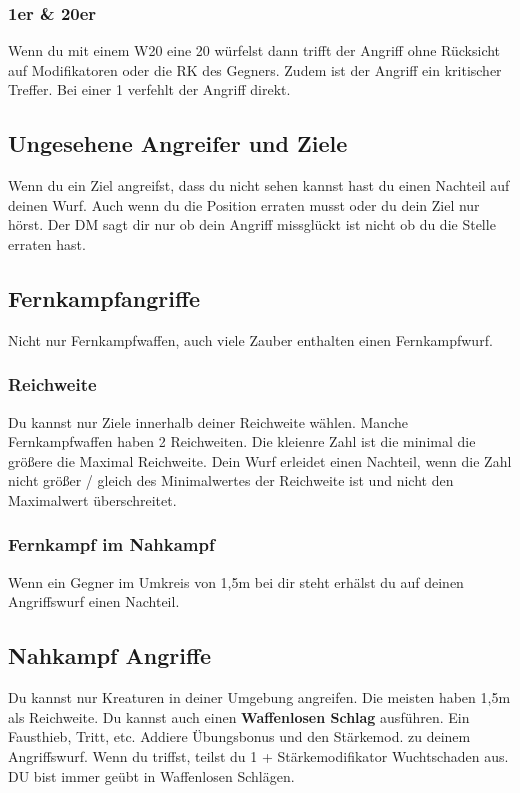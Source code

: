 \subsubsection{1er \& 20er}
Wenn du mit einem W20 eine 20 würfelst dann trifft der Angriff ohne Rücksicht auf Modifikatoren oder die RK des Gegners. Zudem ist der Angriff ein kritischer Treffer. Bei einer 1 verfehlt der Angriff direkt.

\subsection{Ungesehene Angreifer und Ziele}
Wenn du ein Ziel angreifst, dass du nicht sehen kannst hast du einen Nachteil auf deinen Wurf. Auch wenn du die Position erraten musst oder du dein Ziel nur hörst. Der DM sagt dir nur ob dein Angriff missglückt ist nicht ob du die Stelle erraten hast.

\subsection{Fernkampfangriffe}
Nicht nur Fernkampfwaffen, auch viele Zauber enthalten einen Fernkampfwurf.

\subsubsection{Reichweite}
Du kannst nur Ziele innerhalb deiner Reichweite wählen. Manche Fernkampfwaffen haben 2 Reichweiten. Die kleienre Zahl ist die minimal die größere die Maximal Reichweite. Dein Wurf erleidet einen Nachteil, wenn die Zahl nicht größer / gleich des Minimalwertes der Reichweite ist und nicht den Maximalwert überschreitet.

\subsubsection{Fernkampf im Nahkampf}
Wenn ein Gegner im Umkreis von 1,5m bei dir steht erhälst du auf deinen Angriffswurf einen Nachteil.

\subsection{Nahkampf Angriffe}
Du kannst nur Kreaturen in deiner Umgebung angreifen. Die meisten haben 1,5m als Reichweite. Du kannst auch einen \textbf{Waffenlosen Schlag} ausführen. Ein Fausthieb, Tritt, etc. Addiere Übungsbonus und den Stärkemod. zu deinem Angriffswurf. Wenn du triffst, teilst du 1 + Stärkemodifikator Wuchtschaden aus. DU bist immer geübt in Waffenlosen Schlägen.

